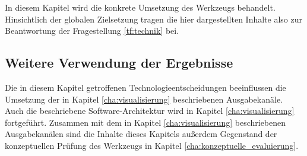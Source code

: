 In diesem Kapitel wird die konkrete Umsetzung des Werkzeugs behandelt. Hinsichtlich der globalen Zielsetzung tragen die hier dargestellten Inhalte also zur Beantwortung der Fragestellung \ref{tf:technik} bei.

\subsection{Weitere Verwendung der Ergebnisse}

Die in diesem Kapitel getroffenen Technologieentscheidungen beeinflussen die Umsetzung der in Kapitel \ref{cha:visualisierung} beschriebenen Ausgabekanäle. Auch die beschriebene Software-Architektur wird in Kapitel \ref{cha:visualisierung} fortgeführt. Zusammen mit dem in Kapitel \ref{cha:visualisierung} beschriebenen Ausgabekanälen sind die Inhalte dieses Kapitels außerdem Gegenstand der konzeptuellen Prüfung des Werkzeugs in Kapitel \ref{cha:konzeptuelle_evaluierung}.


